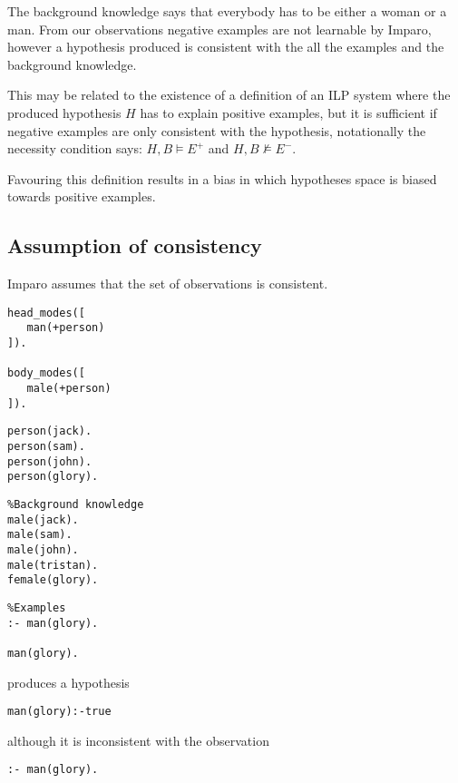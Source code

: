 The background knowledge says that everybody has to be either a woman or a man. From our observations negative examples are not learnable by Imparo, however a hypothesis produced is consistent with the all the examples and the background knowledge.

This may be related to the existence of a definition of an ILP system where the produced hypothesis $H$ has to explain positive examples, but it is sufficient if negative examples are only consistent with the hypothesis, notationally the necessity condition says:
$H, B \models E^+$ and $H, B \not \models E^-$.

Favouring this definition results in a bias in which hypotheses space is biased towards positive examples.

\subsection{Assumption of consistency}
Imparo assumes that the set of observations is consistent.

\begin{minipage}[t]{.25\textwidth}
\begin{lstlisting}
head_modes([
   man(+person)
]).

body_modes([
   male(+person)
]).\end{lstlisting}
\end{minipage}
\begin{minipage}[t]{.20\textwidth}
\begin{lstlisting}
person(jack).
person(sam).
person(john).
person(glory).
\end{lstlisting}
\end{minipage}
\begin{minipage}[t]{.30\textwidth}
\begin{lstlisting}
%Background knowledge
male(jack).
male(sam).
male(john).
male(tristan).
female(glory).
\end{lstlisting}
\end{minipage}
\begin{minipage}[t]{.25\textwidth}
\begin{lstlisting}
%Examples
:- man(glory).

man(glory).
\end{lstlisting}
\end{minipage}

produces a hypothesis
\begin{lstlisting}
man(glory):-true
\end{lstlisting}
although it is inconsistent with the observation
\begin{lstlisting}
:- man(glory).
\end{lstlisting}


